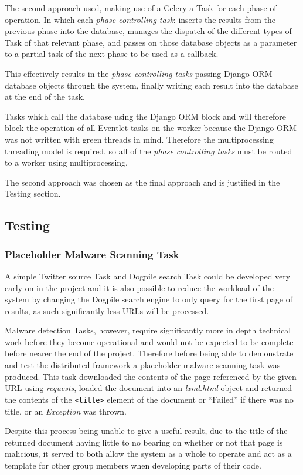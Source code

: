 The second approach used, making use of a Celery a Task for each phase of operation.  In which each \emph{phase controlling task}: inserts the results from the previous phase into the database, manages the dispatch of the different types of Task of that relevant phase, and passes on those database objects as a parameter to a partial task of the next phase to be used as a callback. 

This effectively results in the \emph{phase controlling tasks} passing Django ORM database objects through the system, finally writing each result into the database at the end of the task.

Tasks which call the database using the Django ORM block and will therefore block the operation of all Eventlet tasks on the worker because the Django ORM was not written with green threads in mind.  Therefore the multiprocessing threading model is required, so all of the \emph{phase controlling tasks} must be routed to a worker using multiprocessing.

The second approach was chosen as the final approach and is justified in the Testing section.

\subsection{Testing}
\subsubsection{Placeholder Malware Scanning Task}
A simple Twitter source Task and Dogpile search Task could be developed very early on in the project and it is also possible to reduce the workload of the system by changing the Dogpile search engine to only query for the first page of results, as such significantly less URLs will be processed.

Malware detection Tasks, however, require significantly more in depth technical work before they become operational and would not be expected to be complete before nearer the end of the project. Therefore before being able to demonstrate and test the distributed framework a placeholder malware scanning task was produced. This task downloaded the contents of the page referenced by the given URL using \emph{requests}, loaded the document into an \emph{lxml.html} object and returned the contents of the \verb`<title>` element of the document or ``Failed'' if there was no title, or an \emph{Exception} was thrown.

Despite this process being unable to give a useful result, due to the title of the returned document having little to no bearing on whether or not that page is malicious, it served to both allow the system as a whole to operate and act as a template for other group members when developing parts of their code.

